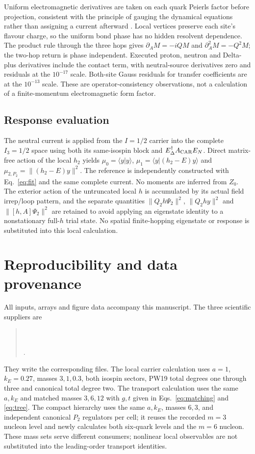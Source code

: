 \documentclass[11pt]{article}
\begin{document}
Uniform electromagnetic derivatives are taken on each quark Peierls factor before projection, consistent with the principle of gauging the dynamical equations rather than assigning a current afterward \cite{Kvinikhidze1999GaugingEquations}. Local vertices preserve each site's flavour charge, so the uniform bond phase has no hidden resolvent dependence. The product rule through the three hops gives $\partial_A M=-iQM$ and $\partial_A^2M=-Q^2M$; the two-hop return is phase independent. Executed proton, neutron and Delta-plus derivatives include the contact term, with neutral-source derivatives zero and residuals at the $10^{-17}$ scale. Both-site Gauss residuals for transfer coefficients are at the $10^{-13}$ scale. These are operator-consistency observations, not a calculation of a finite-momentum electromagnetic form factor.

\subsection{Response evaluation}
The neutral current is applied from the $I=1/2$ carrier into the complete $I_3=1/2$ space using both its same-isospin block and $E_\Delta^\dagger A_{\rm CAR}E_N$. Direct matrix-free action of the local $h_2$ yields $\mu_0=\langle y|y\rangle$, $\mu_1=\langle y|(h_2-E)y\rangle$ and $\mu_{2,P_2}=\|(h_2-E)y\|^2$. The reference is independently constructed with Eq.~\eqref{eq:fit} and the same complete current. No moments are inferred from $Z_0$. The exterior action of the untruncated local $h$ is accumulated by its actual field irrep/loop pattern, and the separate quantities $\|Q_2h\Psi_2\|^2$, $\|Q_2hy\|^2$ and $\|[h,A]\Psi_2\|^2$ are retained to avoid applying an eigenstate identity to a nonstationary full-$h$ trial state. No spatial finite-hopping eigenstate or response is substituted into this local calculation.

\section{Reproducibility and data provenance}
All inputs, arrays and figure data accompany this manuscript. The three scientific suppliers are
\begin{quote}\small{}\\
\\
.
\end{quote}
They write the corresponding  files. The local carrier calculation uses $a=1$, $k_E=0.27$, masses $3,1,0.3$, both isospin sectors, PW19 total degrees one through three and canonical total degree two. The transport calculation uses the same $a,k_E$ and matched masses $3,6,12$ with $g,t$ given in Eqs.~\eqref{eq:matching} and \eqref{eq:tree}. The compact hierarchy uses the same $a,k_E$, masses $6,3$, and independent canonical $P_2$ regulators per cell; it reuses the recorded $m=3$ nucleon level and newly calculates both six-quark levels and the $m=6$ nucleon. These mass sets serve different consumers; nonlinear local observables are not substituted into the leading-order transport identities.
\end{document}
